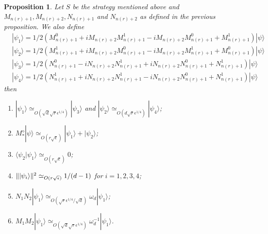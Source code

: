 \documentclass[11pt,letterpaper]{article}
\newcommand{\ket}[1]{|#1\rangle}
\newcommand{\braket}[2]{\langle#1|#2\rangle}
\DeclarePairedDelimiter{\norm}{\lVert}{\rVert}
\newcommand{\1}{\mathbb{1}}
\newcommand{\nr}{n(r)}
\newcommand{\se}{\sqrt{\epsilon}}
\newcommand{\qe}{\epsilon^{1/4}}
\newcommand{\sd}{\sqrt{d}}
\newcommand{\sr}{\sqrt{r}}
\newcommand{\appd}[1]{\simeq_{#1}}
\newtheorem{proposition}[theorem]{Proposition}
\theoremstyle{definition}
\begin{document}
\begin{proposition}
	Let $S$ be the strategy mentioned above and $M_{\nr+1}, M_{\nr+2},N_{\nr+1}$ and $N_{\nr+2}$ as defined in the previous proposition.
	We also define
	\begin{align}
		&\ket{\psi_1} =1/2(M_{\nr+1}^0 + iM_{\nr+2}M_{\nr+1}^1 - iM_{\nr+2}M_{\nr+1}^0 +M_{\nr+1}^1) \ket{\psi} \\
		&\ket{\psi_2} = 1/2(M_{\nr+1}^1 + iM_{\nr+2}M_{\nr+1}^0 -iM_{\nr+2}M_{\nr+1}^1 + M_{\nr+1}^0)  \ket{\psi} \\
		&\ket{\psi_3} =1/2 (N_{\nr+1}^0 - iN_{\nr+2}N_{\nr+1}^1+iN_{\nr+2}N_{\nr+1}^0 + N_{\nr+1}^1)\ket{\psi}\\
		&\ket{\psi_4} =1/2(N_{\nr+1}^1 + iN_{\nr+2}N_{\nr+1}^1 -iN_{\nr+2}N_{\nr+1}^0 + N_{\nr+1}^1)\ket{\psi}
	\end{align}
	then
	\begin{enumerate}
	\item $\ket{\psi_1} \appd{O(\sd \sr\qe)} \ket{\psi_3}$ and $\ket{\psi_2} \appd{O(d \sr\qe)} \ket{\psi_4}$; 
	\item $M_\ast^\diamond \ket{\psi} \appd{O( r\se)} \ket{\psi_1}+\ket{\psi_2}$;
	\item $\braket{\psi_2}{\psi_1} \appd{O( r\se)} 0$;
	\item $\norm{\ket{\psi_i}}^2 \appd{O(r\se)} 1/(d-1)$ for $i = 1, 2, 3, 4$;
	\item $N_1N_2 \ket{\psi_1} \appd{O(\sr \qe/\sd)} \omega_d\ket{\psi_1}$;
	\item $M_1M_2 \ket{\psi_1} \appd{O(\sd\sr \qe)} \omega_d^{-1} \ket{\psi_1}$.
	\end{enumerate}
\end{proposition}
\end{document}
